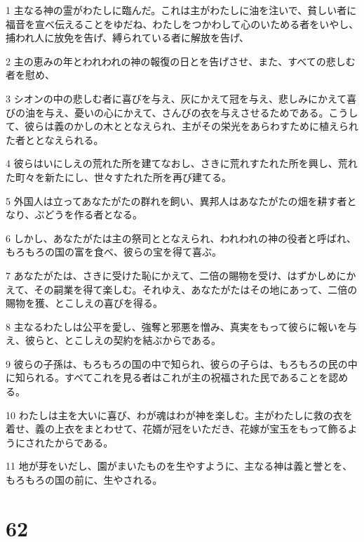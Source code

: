 \par 1 主なる神の霊がわたしに臨んだ。これは主がわたしに油を注いで、貧しい者に福音を宣べ伝えることをゆだね、わたしをつかわして心のいためる者をいやし、捕われ人に放免を告げ、縛られている者に解放を告げ、
\par 2 主の恵みの年とわれわれの神の報復の日とを告げさせ、また、すべての悲しむ者を慰め、
\par 3 シオンの中の悲しむ者に喜びを与え、灰にかえて冠を与え、悲しみにかえて喜びの油を与え、憂いの心にかえて、さんびの衣を与えさせるためである。こうして、彼らは義のかしの木ととなえられ、主がその栄光をあらわすために植えられた者ととなえられる。
\par 4 彼らはいにしえの荒れた所を建てなおし、さきに荒れすたれた所を興し、荒れた町々を新たにし、世々すたれた所を再び建てる。
\par 5 外国人は立ってあなたがたの群れを飼い、異邦人はあなたがたの畑を耕す者となり、ぶどうを作る者となる。
\par 6 しかし、あなたがたは主の祭司ととなえられ、われわれの神の役者と呼ばれ、もろもろの国の富を食べ、彼らの宝を得て喜ぶ。
\par 7 あなたがたは、さきに受けた恥にかえて、二倍の賜物を受け、はずかしめにかえて、その嗣業を得て楽しむ。それゆえ、あなたがたはその地にあって、二倍の賜物を獲、とこしえの喜びを得る。
\par 8 主なるわたしは公平を愛し、強奪と邪悪を憎み、真実をもって彼らに報いを与え、彼らと、とこしえの契約を結ぶからである。
\par 9 彼らの子孫は、もろもろの国の中で知られ、彼らの子らは、もろもろの民の中に知られる。すべてこれを見る者はこれが主の祝福された民であることを認める。
\par 10 わたしは主を大いに喜び、わが魂はわが神を楽しむ。主がわたしに救の衣を着せ、義の上衣をまとわせて、花婿が冠をいただき、花嫁が宝玉をもって飾るようにされたからである。
\par 11 地が芽をいだし、園がまいたものを生やすように、主なる神は義と誉とを、もろもろの国の前に、生やされる。

\chapter{62}

